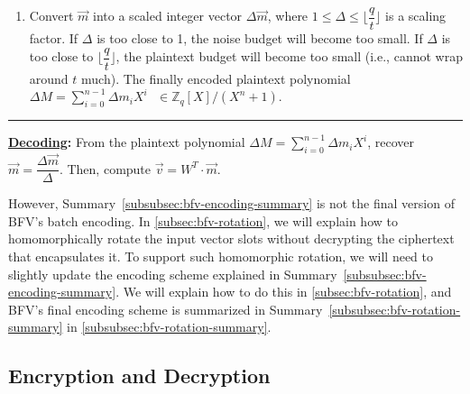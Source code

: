 \begin{tcolorbox}[title={\textbf{\tboxlabel{\ref*{subsubsec:bfv-encoding-summary}} BFV's Encoding and Decoding}}]
\begin{enumerate}
\item Convert $\vec{m}$ into a scaled integer vector $\Delta\vec{m}$, where $1 \leq \Delta \leq \lfloor \dfrac{q}{t}\rfloor$ is a scaling factor. If $\Delta$ is too close to 1, the noise budget will become too small. If $\Delta$ is too close to $\lfloor\dfrac{q}{t}\rfloor$, the plaintext budget will become too small (i.e., cannot wrap around $t$ much). The finally encoded plaintext polynomial $\Delta M = \sum\limits_{i=0}^{n-1}  \Delta m_i X^i \text{ } \in \mathbb{Z}_q[X] / (X^n + 1)$. %

\end{enumerate}

\par\noindent\rule{\textwidth}{0.4pt}

\textbf{\underline{Decoding}:} From the plaintext polynomial $\Delta M = \sum\limits_{i=0}^{n-1}$$\Delta m_iX^i$, recover $\vec{m} = \dfrac{\Delta \vec{m}}{\Delta}$. Then,
compute $\vec{v} = W^T \cdot \vec{m}$.

\end{tcolorbox}



However, Summary~\ref*{subsubsec:bfv-encoding-summary} is not the final version of BFV's batch encoding. In \autoref{subsec:bfv-rotation}, we will explain how to homomorphically rotate the input vector slots without decrypting the ciphertext that encapsulates it. To support such homomorphic rotation, we will need to slightly update the encoding scheme explained in Summary~\ref*{subsubsec:bfv-encoding-summary}. We will explain how to do this in \autoref{subsec:bfv-rotation}, and BFV's final encoding scheme is summarized in Summary~\ref*{subsubsec:bfv-rotation-summary} in \autoref{subsubsec:bfv-rotation-summary}.


\subsection{Encryption and Decryption}
\label{subsec:bfv-enc-dec}

